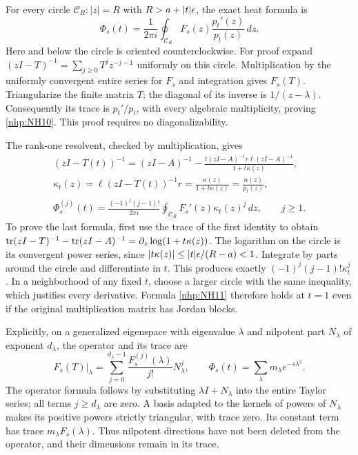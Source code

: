For every circle \(\mathcal C_R:|z|=R\) with
\(R>a+|t|\epsilon\), the exact heat formula is
\begin{equation}\tag{NH10}\label{nhp:NH10}
\Phi_s(t)=\frac1{2\pi i}\oint_{\mathcal C_R}
F_s(z)\frac{p_t'(z)}{p_t(z)}\,dz .
\end{equation}
Here and below the circle is oriented counterclockwise.
For proof expand \((zI-T)^{-1}=\sum_{j\ge0}T^jz^{-j-1}\)
uniformly on this circle. Multiplication by the uniformly
convergent entire series for \(F_s\) and integration gives
\(F_s(T)\). Triangularize the finite matrix \(T\);
the diagonal of its inverse is \(1/(z-\lambda)\).
Consequently its trace is \(p_t'/p_t\), with every
algebraic multiplicity, proving \eqref{nhp:NH10}.
This proof requires no diagonalizability.

The rank-one resolvent, checked by multiplication, gives
\begin{equation}\tag{NH11}\label{nhp:NH11}
\begin{gathered}
(zI-T(t))^{-1}
=(zI-A)^{-1}
-\frac{t(zI-A)^{-1}r\ell(zI-A)^{-1}}{1+t\kappa(z)},\\
\kappa_t(z)=\ell(zI-T(t))^{-1}r
=\frac{\kappa(z)}{1+t\kappa(z)}=\frac{n(z)}{p_t(z)},\\
\Phi_s^{(j)}(t)
=\frac{(-1)^j(j-1)!}{2\pi i}
\oint_{\mathcal C_R}F_s'(z)\kappa_t(z)^j\,dz,\qquad j\ge1.
\end{gathered}
\end{equation}
To prove the last formula, first use the trace of the
first identity to obtain
\(\operatorname{tr}(zI-T)^{-1}-\operatorname{tr}(zI-A)^{-1}
=\partial_z\log(1+t\kappa(z))\).
The logarithm on the circle is its convergent power series,
since \(|t\kappa(z)|\le|t|\epsilon/(R-a)<1\).
Integrate by parts around the circle and differentiate
in \(t\). This produces exactly
\((-1)^j(j-1)!\kappa_t^j\).
In a neighborhood of any fixed \(t\), choose a larger
circle with the same inequality, which justifies every
derivative. Formula \eqref{nhp:NH11} therefore holds at \(t=1\)
even if the original multiplication matrix has Jordan blocks.

Explicitly, on a generalized eigenspace with eigenvalue
\(\lambda\) and nilpotent part \(N_\lambda\) of exponent
\(d_\lambda\), the operator and its trace are
\begin{equation}\tag{NH12}\label{nhp:NH12}
F_s(T)|_\lambda
=\sum_{j=0}^{d_\lambda-1}
\frac{F_s^{(j)}(\lambda)}{j!}N_\lambda^j,\qquad
\Phi_s(t)=\sum_\lambda m_\lambda e^{-s\lambda^2}.
\end{equation}
The operator formula follows by substituting
\(\lambda I+N_\lambda\) into the entire Taylor series;
all terms \(j\ge d_\lambda\) are zero.
A basis adapted to the kernels of powers of \(N_\lambda\)
makes its positive powers strictly triangular, with trace
zero. Its constant term has trace \(m_\lambda F_s(\lambda)\).
Thus nilpotent directions have not been deleted from the
operator, and their dimensions remain in its trace.

